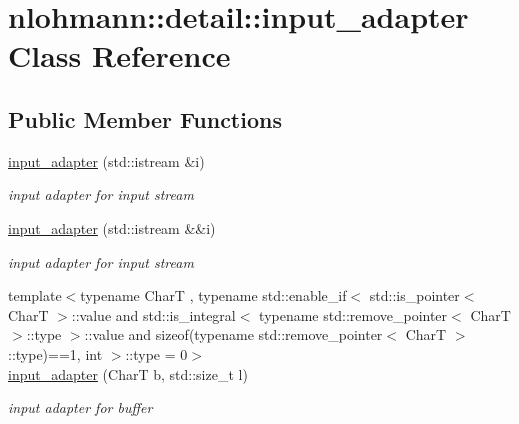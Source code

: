 \hypertarget{classnlohmann_1_1detail_1_1input__adapter}{}\section{nlohmann\+:\+:detail\+:\+:input\+\_\+adapter Class Reference}
\label{classnlohmann_1_1detail_1_1input__adapter}
\subsection*{Public Member Functions}
\begin{DoxyCompactItemize}
\item 
\mbox{\label{classnlohmann_1_1detail_1_1input__adapter_ae89f11268d4724b3080473f7218abe86}} 
\mbox{\hyperlink{classnlohmann_1_1detail_1_1input__adapter_ae89f11268d4724b3080473f7218abe86}{input\+\_\+adapter}} (std\+::istream \&i)
\begin{DoxyCompactList}\small\item\em input adapter for input stream \end{DoxyCompactList}\item 
\mbox{\label{classnlohmann_1_1detail_1_1input__adapter_af002dd2e53ac0855a03cb68d0ce626b2}} 
\mbox{\hyperlink{classnlohmann_1_1detail_1_1input__adapter_af002dd2e53ac0855a03cb68d0ce626b2}{input\+\_\+adapter}} (std\+::istream \&\&i)
\begin{DoxyCompactList}\small\item\em input adapter for input stream \end{DoxyCompactList}\item 
\mbox{\label{classnlohmann_1_1detail_1_1input__adapter_a37816622d79ab4a1a76f4d7e872b65e1}} 
{\footnotesize template$<$typename CharT , typename std\+::enable\+\_\+if$<$ std\+::is\+\_\+pointer$<$ Char\+T $>$\+::value and std\+::is\+\_\+integral$<$ typename std\+::remove\+\_\+pointer$<$ Char\+T $>$\+::type $>$\+::value and sizeof(typename std\+::remove\+\_\+pointer$<$ Char\+T $>$\+::type)==1, int $>$\+::type  = 0$>$ }\\\mbox{\hyperlink{classnlohmann_1_1detail_1_1input__adapter_a37816622d79ab4a1a76f4d7e872b65e1}{input\+\_\+adapter}} (CharT b, std\+::size\+\_\+t l)
\begin{DoxyCompactList}\small\item\em input adapter for buffer \end{DoxyCompactList}\item 

\end{DoxyCompactItemize}
